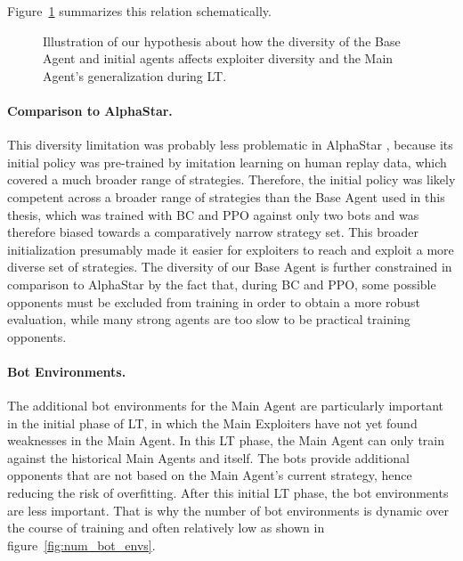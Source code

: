 \documentclass[10pt,twocolumn,letterpaper]{article}
\begin{document}
Figure~\ref{fig:exploiter_diversity_schematic} summarizes this relation schematically.
\begin{figure}[ht]
    \centering
    \resizebox{0.95\linewidth}{!}{}
    \caption{Illustration of our hypothesis about how the diversity of the Base Agent and initial agents affects exploiter diversity and the Main Agent's generalization during LT.}
    \label{fig:exploiter_diversity_schematic}
\end{figure}

\FloatBarrier
\paragraph{Comparison to AlphaStar.}
This diversity limitation was probably less problematic in AlphaStar \cite{vinyals2019alphastar}, because its initial policy was pre-trained by imitation learning on human replay data, which covered a much broader range of strategies.
Therefore, the initial policy was likely competent across a broader range of strategies than the Base Agent used in this thesis, which was trained with BC and PPO against only two bots and was therefore biased towards a comparatively narrow strategy set.
This broader initialization presumably made it easier for exploiters to reach and exploit a more diverse set of strategies.
The diversity of our Base Agent is further constrained in comparison to AlphaStar by the fact that, during BC and PPO, some possible opponents must be excluded from training in order to obtain a more robust evaluation, while many strong agents are too slow to be practical training opponents.


\paragraph{Bot Environments.} 
The additional bot environments for the Main Agent are particularly important in the initial phase of LT, in which the Main Exploiters have not yet found weaknesses in the Main Agent.
In this LT phase, the Main Agent can only train against the historical Main Agents and itself.
The bots provide additional opponents that are not based on the Main Agent’s current strategy, hence reducing the risk of overfitting.
After this initial LT phase, the bot environments are less important.
That is why the number of bot environments is dynamic over the course of training and often relatively low as shown in figure~\ref{fig:num_bot_envs}.
\end{document}
